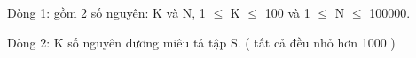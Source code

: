Dòng 1: gồm 2 số nguyên: K và N, 1  $\le$  K  $\le$  100 và 1  $\le$  N  $\le$  100000.

Dòng 2: K số nguyên dương miêu tả tập S. ( tất cả đều nhỏ hơn 1000 )